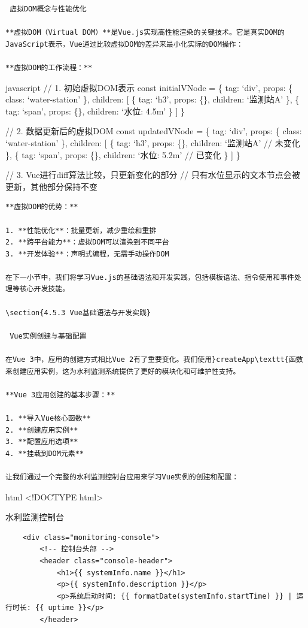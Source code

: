 {{\begin{lstlisting}
 虚拟DOM概念与性能优化

**虚拟DOM（Virtual DOM）**是Vue.js实现高性能渲染的关键技术。它是真实DOM的JavaScript表示，Vue通过比较虚拟DOM的差异来最小化实际的DOM操作：

**虚拟DOM的工作流程：**
\end{lstlisting}

javascript // 1. 初始虚拟DOM表示 const initialVNode = \{ tag: `div', props: \{ class: `water-station' \}, children: {[} \{ tag: `h3', props: \{\}, children: `监测站A' \}, \{ tag: `span', props: \{\}, children: `水位: 4.5m' \} {]} \}

// 2. 数据更新后的虚拟DOM const updatedVNode = \{ tag: `div', props: \{ class: `water-station' \}, children: {[} \{ tag: `h3', props: \{\}, children: `监测站A' // 未变化 \}, \{ tag: `span', props: \{\}, children: `水位: 5.2m' // 已变化 \} {]} \}

// 3. Vue进行diff算法比较，只更新变化的部分 // 只有水位显示的文本节点会被更新，其他部分保持不变

\begin{lstlisting}
**虚拟DOM的优势：**

1. **性能优化**：批量更新，减少重绘和重排
2. **跨平台能力**：虚拟DOM可以渲染到不同平台
3. **开发体验**：声明式编程，无需手动操作DOM

在下一小节中，我们将学习Vue.js的基础语法和开发实践，包括模板语法、指令使用和事件处理等核心开发技能。

\section{4.5.3 Vue基础语法与开发实践}

 Vue实例创建与基础配置

在Vue 3中，应用的创建方式相比Vue 2有了重要变化。我们使用}createApp\texttt{函数来创建应用实例，这为水利监测系统提供了更好的模块化和可维护性支持。

**Vue 3应用创建的基本步骤：**

1. **导入Vue核心函数**
2. **创建应用实例**
3. **配置应用选项**
4. **挂载到DOM元素**

让我们通过一个完整的水利监测控制台应用来学习Vue实例的创建和配置：
\end{lstlisting}

html \textless!DOCTYPE html\textgreater{}

水利监测控制台

\begin{verbatim}
    <div class="monitoring-console">
        <!-- 控制台头部 -->
        <header class="console-header">
            <h1>{{ systemInfo.name }}</h1>
            <p>{{ systemInfo.description }}</p>
            <p>系统启动时间: {{ formatDate(systemInfo.startTime) }} | 运行时长: {{ uptime }}</p>
        </header>
        

\end{verbatim}}}
